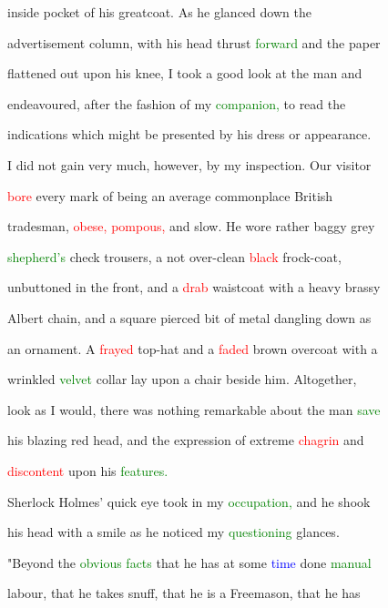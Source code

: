  inside pocket of his greatcoat. As he glanced down the

 advertisement column, with his head thrust \textcolor{green}{forward} and the paper

 flattened out upon his knee, I took a \textcolor{BurntOrange}{good} look at the man and

 endeavoured, after the fashion of my \textcolor{green}{companion,} to read the

 indications which might be \textcolor{BurntOrange}{presented} by his dress or appearance.



 I did not \textcolor{BurntOrange}{gain} very much, however, by my inspection. Our \textcolor{BurntOrange}{visitor}

 \textcolor{red}{bore} every mark of being an average \textcolor{BurntOrange}{commonplace} British

 tradesman, \textcolor{red}{obese,} \textcolor{red}{pompous,} and slow. He wore rather baggy grey

 \textcolor{green}{shepherd's} check trousers, a not over-clean \textcolor{red}{black} frock-coat,

 unbuttoned in the front, and a \textcolor{red}{drab} waistcoat with a heavy brassy

 Albert chain, and a square pierced bit of metal dangling down as

 an ornament. A \textcolor{red}{frayed} top-hat and a \textcolor{red}{faded} brown overcoat with a

 wrinkled \textcolor{green}{velvet} collar lay upon a chair beside him. Altogether,

 look as I would, there was nothing \textcolor{BurntOrange}{remarkable} about the man \textcolor{green}{save}

 his blazing red head, and the expression of extreme \textcolor{red}{chagrin} and

 \textcolor{red}{discontent} upon his \textcolor{green}{features.}



 Sherlock Holmes' quick eye took in my \textcolor{green}{occupation,} and he shook

 his head with a \textcolor{BurntOrange}{smile} as he noticed my \textcolor{green}{questioning} glances.

 "Beyond the \textcolor{green}{obvious} \textcolor{green}{facts} that he has at some \textcolor{blue}{time} done \textcolor{green}{manual}

 labour, that he takes snuff, that he is a Freemason, that he has

